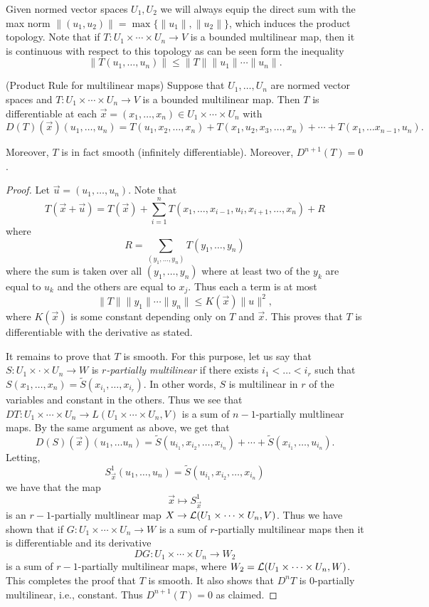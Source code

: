 \documentclass[twoside, a4paper, 10pt]{amsart}
\begin{document}
Given normed vector spaces $U_1, U_2$ we will always equip the direct sum with the max norm $\|(u_1, u_2)\| = \max \{\|u_1\|, \|u_2 \| \}$, which induces the product topology. Note that if $T:U_1 \times \cdots \times U_n \to V$ is a bounded multilinear map, then it is continuous with respect to this topology as can be seen form the inequality $$\|T(u_1, \ldots, u_n)\| \leq \|T\|\|u_1\| \cdots \|u_n\|.$$

\begin{lemma}(Product Rule for multilinear maps) Suppose that $U_1, \ldots, U_n$ are normed vector spaces and $T: U_1 \times \cdots \times U_n \to V$ is a bounded multilinear map. Then $T$ is differentiable at each $\vec{x} = (x_1, \ldots, x_n) \in U_1 \times \cdots \times U_n $ with $$D(T)(\vec{x})(u_1, \ldots, u_n) = T(u_1, x_2, \ldots, x_n) + T(x_1, u_2, x_3, \ldots, x_n) + \cdots + T(x_1, \ldots x_{n-1}, u_n). $$

Moreover, $T$ is in fact smooth (infinitely differentiable). Moreover, $D^{n+1}(T) = 0$.
\end{lemma}

\begin{proof} Let $\vec{u} = (u_1, \ldots, u_n)$. Note that 
$$T(\vec{x} + \vec{u}) = T(\vec{x}) + \sum_{i=1}^n T(x_1, \ldots, x_{i-1}, u_i, x_{i+1}, \ldots, x_n) + R$$ where $$R = \sum_{(y_1, \ldots, y_n)} T(y_1, \ldots, y_n)$$ where the sum is taken over all $(y_1, \ldots, y_n)$ where at least two of the $y_k$ are equal to $u_k$ and the others are equal to $x_j$. Thus each a term is at most $$\|T \|\|y_1\|\cdots \|y_n\| \leq K(\vec{x}) \|u\|^2,$$ where $K(\vec{x})$ is some constant depending only on $T$ and $\vec{x}$. This proves that $T$ is differentiable with the derivative as stated.

It remains to prove that $T$ is smooth. For this purpose, let us say that $S:U_1 \times \cdot \times U_n \to W$ is \textit{$r$-partially multilinear} if there exists $i_1 < \ldots <i_r$ such that $S(x_1, \ldots, x_n) = \tilde{S}(x_{i_1}, \ldots, x_{i_r})$. In other words, $S$ is multilinear in $r$ of the variables and constant in the others. Thus we see that $DT:U_1 \times \cdots \times U_n \to L(U_1 \times \cdots \times U_n, V)$ is a sum of $n-1$-partially multlinear maps. By the same argument as above, we get that 
$$D(S)(\vec{x})(u_1, \ldots u_n) = \tilde{S}(u_{i_1},x_{i_2}, \ldots, x_{i_n}) + \cdots + \tilde{S}(x_{i_1}, \ldots, u_{i_n}).$$ Letting, $$S^1_{\vec{x}}(u_1, \ldots, u_n) = \tilde{S}(u_{i_1},x_{i_2}, \ldots, x_{i_n}) $$ we have that the map
$$\vec{x} \mapsto S^1_{\vec{x}}$$ is an $r-1$-partially multlinear map $X \to \mathcal{L}(U_1 \times \cdots \times U_n, V)$. Thus we have shown that if $G:U_1 \times \cdots \times U_n \to W$ is a sum of $r$-partially multilinear maps then it is differentiable and its derivative $$DG:U_1 \times \cdots \times U_n \to W_2$$ is a sum of $r-1$-partially multilinear maps, where $W_2 = \mathcal{L}(U_1 \times \cdots \times U_n, W)$. This completes the proof that $T$ is smooth. It also shows that $D^nT$ is $0$-partially multilinear, i.e., constant. Thus $D^{n+1}(T) = 0$ as claimed. \end{proof}
\end{document}
